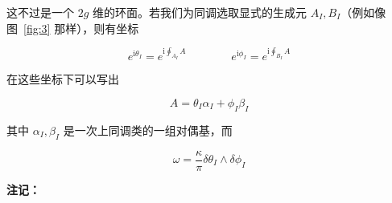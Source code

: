 这不过是一个 $2g$ 维的环面。若我们为同调选取显式的生成元 $A_I,B_I$（例如像图~\ref{fig:3} 那样），则有坐标

\begin{equation}
  e^{\mathrm{i}\theta_I}=e^{\mathrm{i}\oint_{A_I}A}
  \qquad\qquad
  e^{\mathrm{i}\phi_I}=e^{\mathrm{i}\oint_{B_I}A}
  \tag{2.116}
  \label{eq:2.116}
\end{equation}

在这些坐标下可以写出

\begin{equation}
  A=\theta_I\alpha_I+\phi_I\beta_I
  \tag{2.117}
  \label{eq:2.117}
\end{equation}

其中 $\alpha_I,\beta_I$ 是一次上同调类的一组对偶基，而

\begin{equation}
  \omega=\frac{\kappa}{\pi}\delta\theta_I\wedge\delta\phi_I
  \tag{2.118}
  \label{eq:2.118}
\end{equation}


\textbf{注记：}

